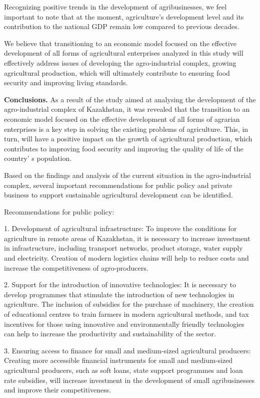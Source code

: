 Recognizing positive trends in the development of agribusinesses, we
feel important to note that at the moment, agriculture's development
level and its contribution to the national GDP remain low compared to
previous decades.

We believe that transitioning to an economic model focused on the
effective development of all forms of agricultural enterprises analyzed
in this study will effectively address issues of developing the
agro-industrial complex, growing agricultural production, which will
ultimately contribute to ensuring food security and improving living
standards.

{\bfseries Conclusions.} As a result of the study aimed at analysing the
development of the agro-industrial complex of Kazakhstan, it was
revealed that the transition to an economic model focused on the
effective development of all forms of agrarian enterprises is a key step
in solving the existing problems of agriculture. This, in turn, will
have a positive impact on the growth of agricultural production, which
contributes to improving food security and improving the quality of life
of the country' s population.

Based on the findings and analysis of the current situation in the
agro-industrial complex, several important recommendations for public
policy and private business to support sustainable agricultural
development can be identified.

Recommendations for public policy:

1. Development of agricultural infrastructure: To improve the conditions
for agriculture in remote areas of Kazakhstan, it is necessary to
increase investment in infrastructure, including transport networks,
product storage, water supply and electricity. Creation of modern
logistics chains will help to reduce costs and increase the
competitiveness of agro-producers.

2. Support for the introduction of innovative technologies: It is
necessary to develop programmes that stimulate the introduction of new
technologies in agriculture. The inclusion of subsidies for the purchase
of machinery, the creation of educational centres to train farmers in
modern agricultural methods, and tax incentives for those using
innovative and environmentally friendly technologies can help to
increase the productivity and sustainability of the sector.

3. Ensuring access to finance for small and medium-sized agricultural
producers: Creating more accessible financial instruments for small and
medium-sized agricultural producers, such as soft loans, state support
programmes and loan rate subsidies, will increase investment in the
development of small agribusinesses and improve their competitiveness.

